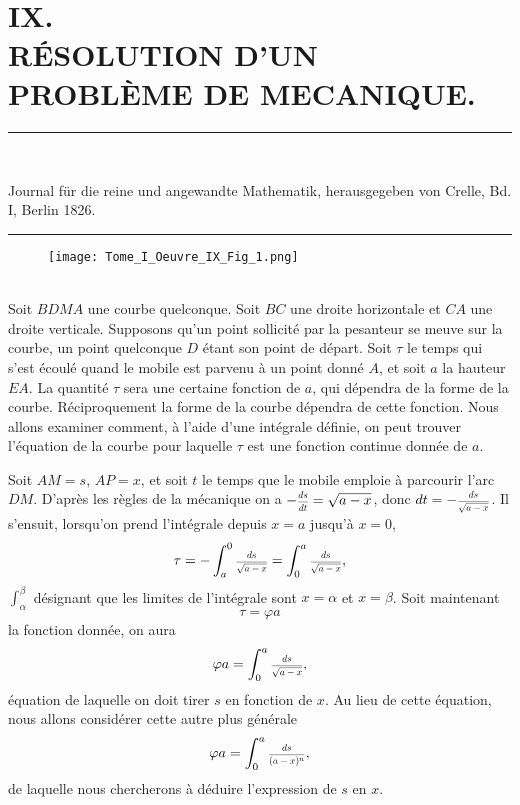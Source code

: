 \documentclass[oneside, 12 pt, leqno]{memoir}
\let\oldfrac\frac
\def\frac#1#2{\mathchoice{\text{\scalebox{.83}{${\oldfrac{#1}{#2}}$}}}{\text{\scalebox{.83}{${\displaystyle\oldfrac{#1}{#2}}$}}}{\genfrac{}{}{}{2}{#1}{#2}}{\genfrac{}{}{}{3}{#1}{#2}}}
\begin{document}
\setlength{\abovedisplayskip}{0.33\baselineskip plus .16\baselineskip minus .16\baselineskip}
\setlength{\belowdisplayskip}{0.33\baselineskip plus .16\baselineskip minus .16\baselineskip}

\;\\ [3\baselineskip]
\section*{{\Large IX.} \\ [\baselineskip]
RÉSOLUTION D'UN PROBLÈME DE MECANIQUE.}
\begin{center}
\rule{2in}{0.1pt}\\ [0.5\baselineskip]
\begin{scriptsize} Journal für die reine und angewandte Mathematik, herausgegeben von Crelle, Bd. I, Berlin 1826. \par\end{scriptsize}
\rule{2in}{0.1pt}
\end{center}

\begin{wrapfigure}{r}[0\baselineskip]{6\baselineskip}\texttt{[image: Tome\_I\_Oeuvre\_IX\_Fig\_1.png]} \end{wrapfigure} \;\\[-0.5\baselineskip]

Soit \(B D M A\) une courbe quelconque. Soit \(B C\) une droite horizontale et \(C A\) une droite verticale. Supposons qu'un point sollicité par la pesanteur se meuve sur la courbe, un point quelconque \(D\) étant son point de départ. Soit \(\tau\) le temps qui s'est écoulé quand le mobile est parvenu à un point donné \(A\), et soit \(a\) la hauteur \(E A\). La quantité \({\tau}\) sera une certaine fonction de \(a\), qui dépendra de la forme de la courbe. Réciproquement la forme de la courbe dépendra de cette fonction. Nous allons examiner comment, à l'aide d'une intégrale définie, on peut trouver l'équation de la courbe pour laquelle \(\tau\) est une fonction continue donnée de \(a\).

Soit \(A M=s\), \(A P=x\), et soit \(t\) le temps que le mobile emploie à parcourir l'arc \(D M\). D'après les règles de la mécanique on a \(-\frac{d s}{d t}=\sqrt{a-x}\), donc \(d t=-\frac{d s}{\sqrt{a-x}}\). Il s'ensuit, lorsqu'on prend l'intégrale depuis \(x=a\) jusqu'à \(x=0\),
\[\tau=-\int_a^0 \frac{d s}{\sqrt{a-x}}=\int_0^a \frac{d s}{\sqrt{a-x}},\]
\(\int_\alpha^\beta\) désignant que les limites de l'intégrale sont \(x=\alpha\) et \(x=\beta\). Soit maintenant
\[\tau=\varphi a\] \clearpage\noindent%
la fonction donnée, on aura
\[\varphi a=\int_0^a \frac{d s}{\sqrt{a-x}},\]
équation de laquelle on doit tirer \(s\) en fonction de \(x\). Au lieu de cette équation, nous allons considérer cette autre plus générale
\[\varphi a=\int_0^a \frac{d s}{(a-x)^n},\]
de laquelle nous chercherons à déduire l'expression de \(s\) en \(x\). 
\end{document}

